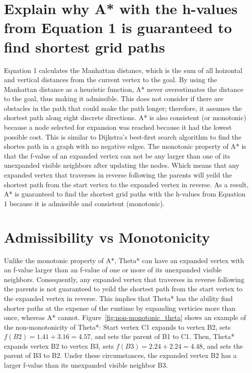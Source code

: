 \documentclass[a4paper,11pt]{report}
\begin{document}
\section{Explain why A* with the h-values from Equation 1 is guaranteed to find shortest grid paths}
Equation 1 calculates the Manhattan distance, which is the sum of all hoizontal and vertical distances from the current vertex to the goal.  By using the Manhattan distance as a heuristic function, A* never overestimates the distance to the goal, thus making it admissible.  This does not consider if there are obstacles in the path that could make the path longer; therefore, it assumes the shortest path along eight discrete directions.  A* is also consistent (or monotonic) because a node selected for expansion was reached because it had the lowest possible cost.  This is similar to Dijkstra's best-first search algorithm to find the shortes path in a graph with no negative edges.  The monotonic property of A* is that the f-value of an expanded vertex can not be any larger than one of its unexpanded visible neighbors after updating the nodes.  Which means that any expanded vertex that traverses in reverse following the parents will yeild the shortest path from the start vertex to the expanded vertex in reverse.  As a result, A* is guaranteed to find the shortest grid paths with the h-values from Equation 1 because it is admissible and consistent (monotonic).

\section{Admissibility vs Monotonicity}

Unlike the monotonic property of A*, Theta* can have an expanded vertex with an f-value larger than an f-value of one or more of its unexpanded visible neighbors.  Consequently, any expanded vertex that traverses in reverse following the parents is not guaranteed to yeild the shortest path from the start vertex to the expanded vertex in reverse.  This implies that Theta* has the ability find shorter paths at the expense of the runtime by expanding verticies more than once, whereas A* cannot.  Figure~\ref{fig:non-monotonic_theta} shows an example of the non-monotonicity of Theta*: Start vertex C1 expands to vertex B2, sets $f(B2) = 1.41+3.16 = 4.57$, and sets the parent of B1 to C1.  Then, Theta* expands vertex B2 to vertex B3, sets $f(B3) = 2.24+2.24 = 4.48$, and sets the parent of B3 to B2.  Under these circumstances, the expanded vertex B2 has a larger f-value than its unexpanded visible neighbor B3.
\end{document}
